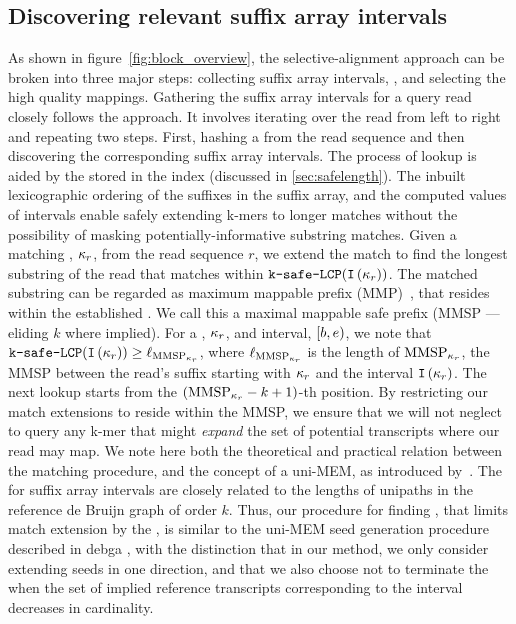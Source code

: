 \subsection{Discovering relevant suffix array intervals}
As shown in figure~\cref{fig:block_overview}, the selective-alignment approach can be 
broken into three major steps: collecting suffix array intervals, \cm, and selecting 
the high quality mappings. Gathering the suffix array intervals for a query read closely 
follows the \qm approach. It involves iterating over the read from left to right and 
repeating two steps. First, hashing a \kmer from the read sequence and then discovering the 
corresponding suffix array intervals. The process of \kmer lookup is aided by the \kslcp 
stored in the index (discussed in \ref{sec:safelength}). The inbuilt lexicographic ordering 
of the suffixes in the suffix array, and the computed \kslcp values of intervals enable 
safely extending k-mers to longer matches without the possibility of masking 
potentially-informative substring matches. Given a matching \kmer, ${\kappa}_r$, 
from the read sequence $r$, we extend the match to find the longest substring of the 
read that matches within $\mathrm{\texttt{k-safe-LCP}}(\texttt{I}\left({\kappa}_r\right))$. The matched 
substring can be regarded as maximum mappable prefix (MMP)~\citep{Dobin2013Star}, that 
resides within the established \kslcp. We call this a maximal mappable safe prefix 
(MMSP --- eliding $k$ where implied). For a \kmer, ${\kappa}_r$, and interval, 
$\left[b,e\right)$, we note that $\mathrm{\texttt{\kslcp}}(\ival{\samplekmer_r}) 
\geq \length{\MMSP_{\samplekmer_r}}$, where $\length{\MMSP_{\samplekmer_r}}$ is the 
length of $\MMSP_{\samplekmer_r}$, the MMSP between the read's suffix starting with 
${\kappa}_r$ and the interval $\texttt{I}\left({\kappa}_r\right)$. The next \kmer lookup starts 
from the $(\MMSP_{\samplekmer_r}-k+1)$-th position. By restricting our match extensions 
to reside within the MMSP, we ensure that we will not neglect to query any k-mer that 
might \emph{expand} the set of potential transcripts where our read may map. We note 
here both the theoretical and practical relation between the \MMSP matching procedure, 
and the concept of a uni-MEM, as introduced by~\citet{debga}. The \kslcp for suffix array 
intervals are closely related to the lengths of unipaths in the reference de Bruijn 
graph of order $k$. Thus, our procedure for finding , that limits match 
extension by the \kslcp, is similar to the uni-MEM seed generation procedure described 
in debga \citep{debga}, with the distinction that in our method, we only consider extending 
seeds in one direction, and that we also choose not to terminate the \kslcp when the set 
of implied reference transcripts corresponding to the interval decreases in cardinality.

